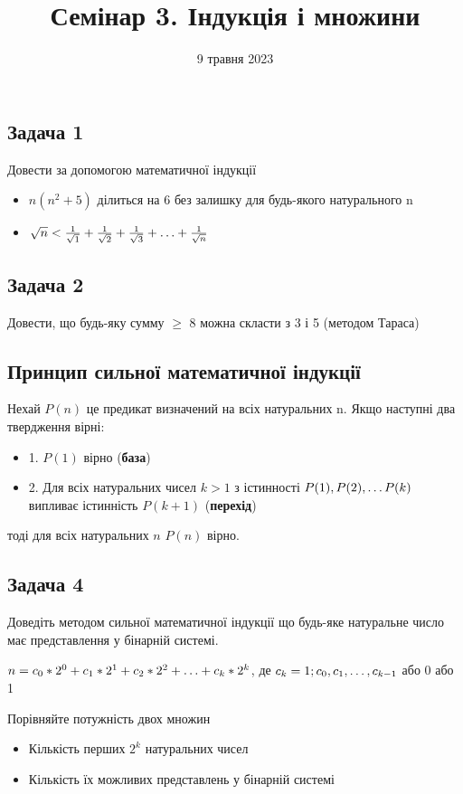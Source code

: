 \documentclass{article}
\begin{document}
\title{Семінар 3. Індукція і множини}
\date{9 травня 2023}

\maketitle

\subsection*{Задача 1}
Довести за допомогою математичної індукції
\begin{itemize}
    \item $n(n^2 + 5)$ ділиться на 6 без залишку для будь-якого натурального n
    \item $\sqrt{n} < \frac{1}{\sqrt{1}} + \frac{1}{\sqrt{2}} + \frac{1}{\sqrt{3}} + \mathellipsis + \frac{1}{\sqrt{n}}$
\end{itemize}

\subsection*{Задача 2}
Довести, що будь-яку сумму $\geq$ 8 можна скласти з 3 і 5 (методом Тараса)

\subsection*{Принцип сильної математичної індукції}
Нехай $P(n)$ це предикат визначений на всіх натуральних n. Якщо наступні два твердження вірні:
\begin{itemize}
    \item 1. $P(1)$ вірно (\textbf{база})
    \item 2. Для всіх натуральних чисел $k > 1$ з істинності $P(1), P(2), \mathellipsis P(k)$ випливає істинність $P(k+1)$ (\textbf{перехід})
\end{itemize}
тоді для всіх натуральних $n$ $P(n)$ вірно.

\subsection*{Задача 4}
Доведіть методом сильної математичної індукції що будь-яке натуральне число має представлення у бінарній системі.

$n = c_0*2^0 + c_1*2^1 + c_2*2^2 + \mathellipsis + c_k*2^k$,
де $c_k=1; c_0,c_1,\mathellipsis,c_{k-1}$ або 0 або 1

Порівняйте потужність двох множин
\begin{itemize}
    \item Кількість перших $2^k$ натуральних чисел
    \item Кількість їх можливих представлень у бінарній системі
\end{itemize}
\end{document}
